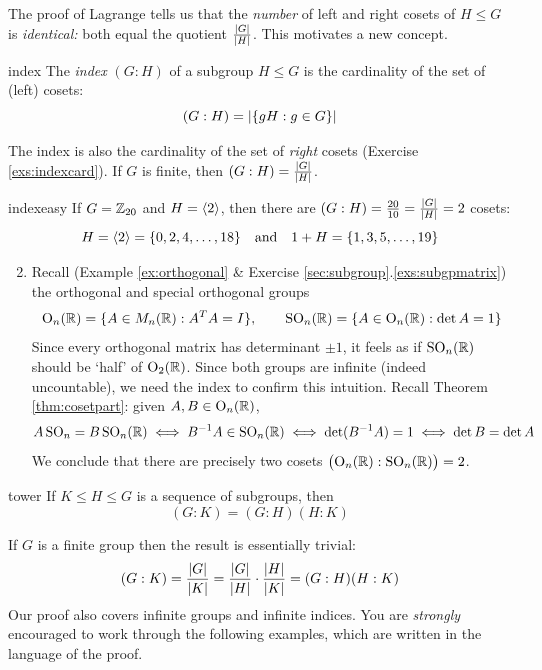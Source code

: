 \goodbreak


The proof of Lagrange tells us that the \emph{number} of left and right cosets of $H\le G$ is \emph{identical:} both equal the quotient $\frac{\left| G\right|}{\left| H\right|}$. This motivates a new concept.

\begin{defn}{}{index}
	The \emph{index} $(G:H)$ of a subgroup $H\le G$ is the cardinality of the set of (left) cosets:
	\[
		(G:H)=\left| \{gH:g\in G\}\right|
	\]
\end{defn}

The index is also the cardinality of the set of \emph{right} cosets (Exercise \ref{exs:indexcard}). If $G$ is finite, then $(G:H)=\frac{\left| G\right|}{\left| H\right|}$.


\begin{examples}{}{indexeasy}
	\exstart If $G=\mathbb{Z}_{20}$ and $H=\left\langle 2\right\rangle$, then there are $(G:H)=\frac{20}{10}=\frac{\left| G\right|}{\left| H\right|}=2$ cosets:
	\[
		H=\left\langle 2\right\rangle=\{0,2,4,\ldots,18\}
		\quad\text{and}\quad 
		1+H=\{1,3,5,\ldots,19\}
		\]
	\begin{enumerate}\setcounter{enumi}{1}
	  \item\label{ex:indexeasy2} Recall (Example \ref{ex:orthogonal} \& Exercise \ref*{sec:subgroup}.\ref{exs:subgpmatrix}) the orthogonal and special orthogonal groups
	  \[
	  	\mathrm{O}_n(\mathbb{R})=\{A\in M_n(\mathbb{R}):A^TA=I\},\qquad
	  	\mathrm{SO}_n(\mathbb{R})=\{A\in\mathrm{O}_n(\mathbb{R}):\det A=1\}
	  \]
	  Since every orthogonal matrix has determinant $\pm 1$, it feels as if $\mathrm{SO}_n(\mathbb{R})$ should be `half' of $\mathrm{O}_2(\mathbb{R})$. Since both groups are infinite (indeed uncountable), we need the index to confirm this intuition. Recall Theorem \ref{thm:cosetpart}: given $A,B\in\mathrm{O}_n(\mathbb{R})$,
	  \[
	  	A\,\mathrm{SO}_n=B\,\mathrm{SO}_n(\mathbb{R})
	  	\iff B^{-1}A\in\mathrm{SO}_n(\mathbb{R})
	  	\iff \det(B^{-1}A)=1
	  	\iff \det B=\det A
	  \]
	  We conclude that there are precisely two cosets $\bigl(\mathrm{O}_n(\mathbb{R}):\mathrm{SO}_n(\mathbb{R})\bigr)=2$.
	\end{enumerate}
\end{examples}


\begin{thm}{}{tower}
	If $K\le H\le G$ is a sequence of subgroups, then
	\[
		(G:K)=(G:H)(H:K)
	\]
\end{thm}

If $G$ is a finite group then the result is essentially trivial:
\[
	(G:K)=\frac{\left| G\right|}{\left| K\right|}
	=\frac{\left| G\right|}{\left| H\right|}\cdot\frac{\left| H\right|}{\left| K\right|}
	=(G:H)(H:K)
\]
Our proof also covers infinite groups and infinite indices. You are \emph{strongly} encouraged to work through the following examples, which are written in the language of the proof.



